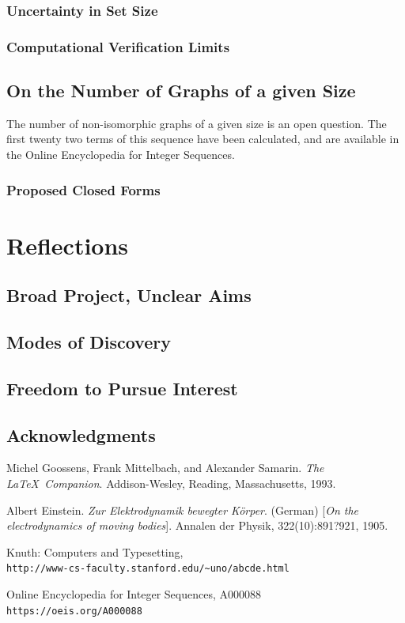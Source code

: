 \documentclass[11pt,a4paper]{report}
\begin{document}
\subsection{Uncertainty in Set Size}
\subsection{Computational Verification Limits}

\section{On the Number of Graphs of a given Size}
The number of non-isomorphic graphs of a given size is an open question.
The first twenty two terms of this sequence have been calculated, and are available in the Online Encyclopedia for Integer Sequences\cite{OEIS}.
\subsection{Proposed Closed Forms}



\chapter{Reflections}
\section{Broad Project, Unclear Aims}
\section{Modes of Discovery}
\section{Freedom to Pursue Interest}
\section{Acknowledgments}





\begin{thebibliography}{9}
Michel Goossens, Frank Mittelbach, and Alexander Samarin. 
\textit{The \LaTeX\ Companion}. 
Addison-Wesley, Reading, Massachusetts, 1993.
 
Albert Einstein. 
\textit{Zur Elektrodynamik bewegter K{\"o}rper}. (German) 
[\textit{On the electrodynamics of moving bodies}]. 
Annalen der Physik, 322(10):891?921, 1905.
 
Knuth: Computers and Typesetting,
\\\texttt{http://www-cs-faculty.stanford.edu/\~{}uno/abcde.html}


Online Encyclopedia for Integer Sequences, A000088
\\\texttt{https://oeis.org/A000088}


\end{thebibliography}
 
 
\end{document}
